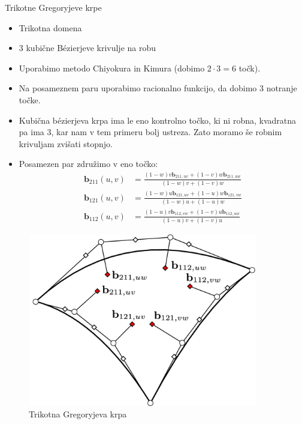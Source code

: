 \documentclass[a4paper,8pt]{beamer}
\newcommand{\tbf}{\textbf}
\begin{document}
\begin{frame}{Trikotne Gregoryjeve krpe}
	\begin{itemize}
		\item Trikotna domena
		\item 3 kubične Bézierjeve krivulje na robu
		\item Uporabimo metodo Chiyokura in Kimura (dobimo $2 \cdot 3 = 6$ točk).
		\item Na posameznem paru uporabimo racionalno funkcijo, da dobimo 3 notranje točke.
		\item Kubična bézierjeva krpa ima le eno kontrolno točko, ki ni robna, kvadratna pa ima 3, kar nam v tem primeru bolj ustreza. Zato moramo še robnim krivuljam zvišati stopnjo.
		\item Posamezen par združimo v eno točko:
		\begin{align*}
		\tbf{b}_{211} (u, v) &= \frac{(1-w)v \tbf{b}_{211,uv}+(1-v)w\tbf{b}_{211,uw}}{(1-w)v+(1-v)w} \\
		\tbf{b}_{121} (u, v) &= \frac{(1-w)u \tbf{b}_{121,uv}+(1-u)w\tbf{b}_{121,vw}}{(1-w)u+(1-u)w} \\
		\tbf{b}_{112} (u, v) &= \frac{(1-u)v \tbf{b}_{112,vw}+(1-v)u\tbf{b}_{112,uw}}{(1-u)v+(1-v)u} 
		\end{align*}
	\end{itemize}
\end{frame}
\begin{frame}
	\begin{figure}[h]
		\centering
		\includegraphics[width=10cm]{gregory_krpe_trikotna.jpg}
		\caption{Trikotna Gregoryjeva krpa}
	\end{figure}
\end{frame}
\end{document}
